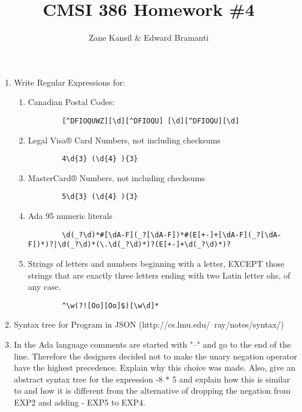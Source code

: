 \documentclass{article}
\begin{document}
\title{CMSI 386 Homework \#4}
\author{Zane Kansil \& Edward Bramanti}
\maketitle
\begin{enumerate}
    \item Write Regular Expressions for: 
    \begin{enumerate}
        \item Canadian Postal Codes:
        \begin{verbatim}
        [^DFIOQUWZ][\d][^DFIOQU] [\d][^DFIOQU][\d]
        \end{verbatim}
        \item Legal Visa® Card Numbers, not including checksums
        \begin{verbatim}
        4\d{3} (\d{4} ){3}
        \end{verbatim}
        \item MasterCard® Numbers, not including checksums
        \begin{verbatim}
        5\d{3} (\d{4} ){3}
        \end{verbatim}
        \item Ada 95 numeric literals
        \begin{verbatim}
        \d(_?\d)*#[\dA-F](_?[\dA-F])*#(E[+-]+[\dA-F](_?[\dA-F])*)?|\d(_?\d)*(\.\d(_?\d)*)?(E[+-]+\d(_?\d)*)?
        \end{verbatim}
        \item Strings of letters and numbers beginning with a letter, EXCEPT those strings that are exactly three letters ending with two Latin letter ohs, of any case.
        \begin{verbatim}
        ^\w(?![Oo][Oo]$)[\w\d]*
        \end{verbatim}
    \end{enumerate}
    \pagebreak
    \item Syntax tree for Program in JSON (http://cs.lmu.edu/~ray/notes/syntax/)
    
    \pagebreak
    \item In the Ada language comments are started with "--" and go to the end of the line. Therefore the designers decided not to make the unary negation operator have the highest precedence. Explain why this choice was made. Also, give an abstract syntax tree for the expression -8 * 5 and explain how this is similar to and how it is different from the alternative of dropping the negation from EXP2 and adding - EXP5 to EXP4. \\

\end{enumerate}
\end{document}
